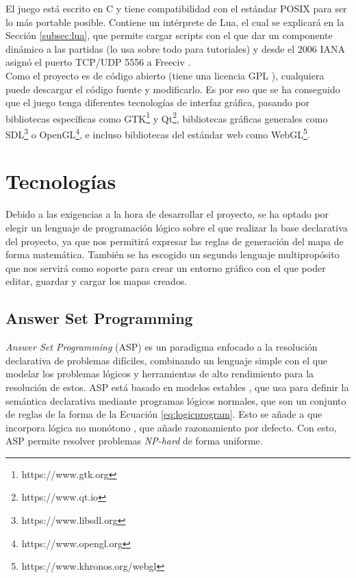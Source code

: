 El juego está escrito en C y tiene compatibilidad con el estándar POSIX para ser lo más portable posible. Contiene un intérprete de Lua, el cual se explicará en la Sección \ref{subsec:lua}, que permite cargar scripts con el que dar un componente dinámico a las partidas (lo usa sobre todo para tutoriales) y desde el 2006 IANA asignó el puerto TCP/UDP 5556 a Freeciv \cite{iana_2006}. \\

Como el proyecto es de código abierto (tiene una licencia GPL \cite{gplv3}), cualquiera puede descargar el código fuente y modificarlo. Es por eso que se ha conseguido que el juego tenga diferentes tecnologías de interfaz gráfica, pasando por bibliotecas específicas como GTK\footnote{https://www.gtk.org} y Qt\footnote{https://www.qt.io}, bibliotecas gráficas generales como SDL\footnote{https://www.libsdl.org} o OpenGL\footnote{https://www.opengl.org}, e incluso bibliotecas del estándar web como WebGL\footnote{https://www.khronos.org/webgl}.

\section{Tecnologías}

Debido a las exigencias a la hora de desarrollar el proyecto, se ha optado por elegir un lenguaje de programación lógico sobre el que realizar la base declarativa del proyecto, ya que nos permitirá expresar las reglas de generación del mapa de forma matemática. También se ha escogido un segundo lenguaje multipropósito que nos servirá como soporte para crear un entorno gráfico con el que poder editar, guardar y cargar los mapas creados.

\subsection{Answer Set Programming}\label{subsec:asp}

\textit{Answer Set Programming} (ASP) \cite{asp} es un paradigma enfocado a la resolución declarativa de problemas difíciles, combinando un lenguaje simple con el que modelar los problemas lógicos y herramientas de alto rendimiento para la resolución de estos. ASP está basado en modelos estables \cite{stablemodels}, que usa para definir la semántica declarativa mediante programas lógicos normales, que son un conjunto de reglas de la forma de la Ecuación \ref{eq:logicprogram}. Esto se añade a que incorpora lógica no monótono \cite{nonmonotonic}, que añade razonamiento por defecto. Con esto, ASP permite resolver problemas \textit{NP-hard} de forma uniforme.


